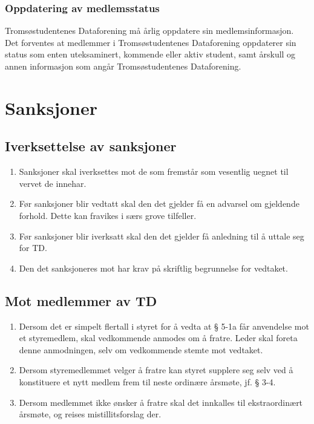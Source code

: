 \documentclass[11pt]{article}
\begin{document}
\subsubsection{Oppdatering av medlemsstatus}
Tromsøstudentenes Dataforening må årlig oppdatere sin medlemsinformasjon.
Det forventes at medlemmer i Tromsøstudentenes Dataforening oppdaterer sin status som enten uteksaminert, kommende eller aktiv student, samt årskull og annen informasjon som angår Tromsøstudentenes Dataforening.

\section{Sanksjoner}
\subsection{Iverksettelse av sanksjoner}
\begin{enumerate}
	\item Sanksjoner skal iverksettes mot de som fremstår som vesentlig uegnet til vervet de innehar.
	\item Før sanksjoner blir vedtatt skal den det gjelder få en advarsel om gjeldende forhold. Dette kan fravikes i særs grove tilfeller.
	\item Før sanksjoner blir iverksatt skal den det gjelder få anledning til å uttale seg for TD.
	\item Den det sanksjoneres mot har krav på skriftlig begrunnelse for vedtaket.
\end{enumerate}

\subsection{Mot medlemmer av TD}
\begin{enumerate}
	\item Dersom det er simpelt flertall i styret for å vedta at § 5-1a får anvendelse mot et styremedlem, skal vedkommende anmodes om å fratre. Leder skal foreta denne anmodningen, selv om vedkommende stemte mot vedtaket.
	\item Dersom styremedlemmet velger å fratre kan styret supplere seg selv ved å konstituere et nytt medlem frem til neste ordinære årsmøte, jf. § 3-4.
	\item Dersom medlemmet ikke ønsker å fratre skal det innkalles til ekstraordinært årsmøte, og reises mistillitsforslag der.
\end{enumerate}
\end{document}
